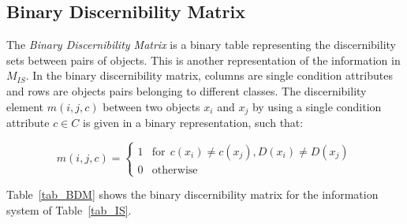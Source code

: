 \documentclass[authoryear,11pt]{elsarticle}
\begin{document}
%  
%  

\subsection{Binary Discernibility Matrix}
  The \textit{Binary Discernibility Matrix} is a binary table representing the discernibility sets between pairs 
  of objects. This is another representation of the information in $M_{IS}$. In the binary discernibility
  matrix, columns are single condition attributes and rows are objects pairs belonging to different classes.
  The discernibility element $m(i, j, c)$ between two objects $x_i$ and $x_j$ by using a single condition 
  attribute $c \in C$ is given in a binary representation, such that:
  
  \begin{equation}
  	m(i, j, c)=\left\lbrace\begin{array}{cl}
  			1 & \mathrm{for~~}c(x_i) \neq c(x_j),D(x_i) \neq D(x_j)\\
  			0 								   & \mathrm{otherwise} 
  	\end{array}\right.
  \end{equation} 
  
  Table~\ref{tab_BDM} shows the binary discernibility matrix for the information system of Table~\ref{tab_IS}.  
  
\end{document}
